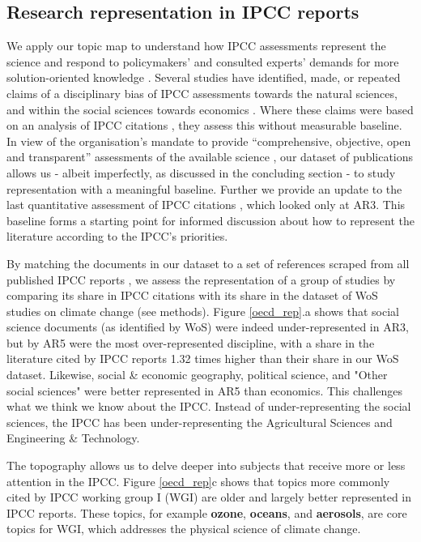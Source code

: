 \documentclass{article}
\begin{document}
\begin{linenumbers}
		
		\subsection*{Research representation in IPCC reports}
		We apply our topic map to understand how IPCC assessments represent the science and respond to policymakers' and consulted experts' demands for more solution-oriented knowledge \cite{Kowarsch2017}.  Several studies have identified, made, or repeated claims of a disciplinary bias of IPCC assessments towards the natural sciences, and within the social sciences towards economics \cite{Bjurström2011, Victor2015, Hulme2010, Corbera2016}. Where these claims were based on an analysis of IPCC citations \cite{Bjurström2011}, they assess this without measurable baseline. 
		In view of the organisation's mandate to provide ``comprehensive, objective, open and transparent'' assessments of the available science \cite{IPCC2013}, our dataset of publications allows us - albeit imperfectly, as discussed in the concluding section - to study representation with a meaningful baseline. Further we provide an update to the last quantitative assessment of IPCC citations \cite{Bjurström2011}, which looked only at AR3. 
		This baseline forms a starting point for informed discussion about how to represent the literature according to the IPCC's priorities.  
		
		
		By matching the documents in our dataset to a set of references scraped from all published IPCC reports \cite{Minx2017l}, we assess the representation of a group of studies by comparing its share in IPCC citations with its share in the dataset of WoS studies on climate change (see methods). 		
		Figure \ref{oecd_rep}.a shows that social science documents (as identified by WoS) were indeed under-represented in AR3, but by AR5 were the most over-represented discipline, with a share in the literature cited by IPCC reports 1.32 times higher than their share in our WoS dataset. Likewise, social \& economic geography, political science, and "Other social sciences" were better represented in AR5 than economics. 	
		This challenges what we think we know about the IPCC. 
		Instead of under-representing the social sciences, the IPCC has been under-representing the Agricultural Sciences and Engineering \& Technology.
		
		
		The topography allows us to delve deeper into subjects that receive more or less attention in the IPCC. 
		Figure \ref{oecd_rep}c shows that topics more commonly cited by IPCC working group I (WGI) are older and largely better represented in IPCC reports. These topics, for example \textbf{ozone}, \textbf{oceans}, and \textbf{aerosols}, are core topics for WGI, which addresses the physical science of climate change.
		

\end{linenumbers}
\end{document}
